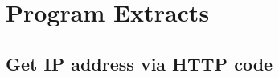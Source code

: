 \begin{appendices}
	\label{Appendix:start}
	\section{Program Extracts}{
		\subsection{Get IP address via HTTP code}
		{
			\label{appendix:get-IP-Address-Via-HTTP}
			
		}
	}
\end{appendices}